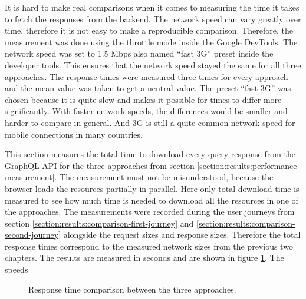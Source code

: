It is hard to make real comparisons when it comes to measuring the time it takes to fetch the responses from the backend. The network speed can vary greatly over time, therefore it is not easy to make a reproducible comparison. Therefore, the measurement was done using the throttle mode inside the \href{https://developer.chrome.com/docs/devtools/}{Google DevTools}. The network speed was set to 1.5 Mbps also named \enquote{fast 3G} preset inside the developer tools. This ensures that the network speed stayed the same for all three approaches. The response times were measured three times for every approach and the mean value was taken to get a neutral value. The preset \enquote{fast 3G} was chosen because it is quite slow and makes it possible for times to differ more significantly. With faster network speeds, the differences would be smaller and harder to compare in general. And 3G is still a quite common network speed for mobile connections in many countries. 

\bigskip

\noindent This section measures the total time to download every query response from the GraphQL \ac{API} for the three approaches from section \ref{section:results:performance-measurement}. The measurement must not be misunderstood, because the browser loads the resources partially in parallel. Here only total download time is measured to see how much time is needed to download all the resources in one of the approaches. The measurements were recorded during the user journeys from section \ref{section:results:comparison-first-journey} and \ref{section:results:comparison-second-journey} alongside the request sizes and response sizes. Therefore the total response times correspond to the measured network sizes from the previous two chapters. The results are measured in seconds and are shown in figure \ref{fig:discussion:response-times}. The speeds

\begin{figure}[H]
  \centering
  \caption{Response time comparison between the three approaches.}\label{fig:discussion:response-times}
\end{figure}

